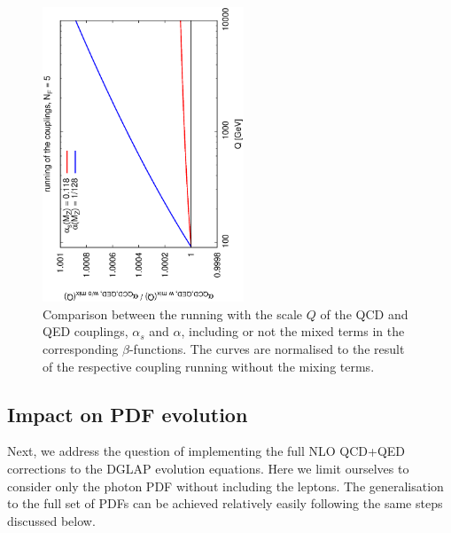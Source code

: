 \begin{figure}[h]
\includegraphics[width=6cm,angle=270]{figs/couplings.eps} 
\caption{Comparison between the running with the scale
$Q$ of the QCD and QED couplings,
  $\alpha_s$ and $\alpha$, including or not the mixed terms in
  the corresponding $\beta$-functions.
%
  The curves are normalised to the result of the respective coupling
  running without the mixing terms.}
\label{fig:CouplingEvol}
\end{figure}

\subsection{Impact on PDF evolution}

Next, we address the question of implementing the full NLO
QCD+QED corrections to the DGLAP evolution equations. Here we limit
ourselves to consider only the photon PDF without including the
leptons. The generalisation to the full set of PDFs can be achieved
relatively easily following the same steps discussed below.

